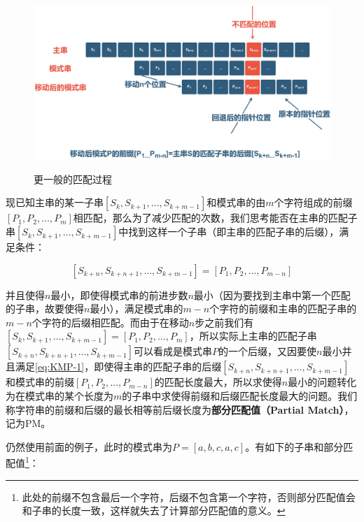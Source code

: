 \begin{figure}[!htb]
    \centering
    \includegraphics[width=0.8\linewidth]{images/KMP-2.pdf}\\
    \caption{更一般的匹配过程}
\end{figure}

现已知主串的某一子串$[S_k, S_{k + 1}, \dots, S_{k + m - 1}]$和模式串的由$m$个字符组成的前缀$[P_1, P_2, \dots, P_m]$相匹配，那么为了减少匹配的次数，我们思考能否在主串的匹配子串$[S_k, S_{k + 1}, \dots, S_{k + m - 1}]$中找到这样一个子串（即主串的匹配子串的后缀），满足条件：

\begin{equation}\label{eq:KMP-1}
    [S_{k + n}, S_{k + n + 1}, \dots, S_{k + m - 1}] = [P_1, P_2, \dots, P_{m - n}]
\end{equation}

并且使得$n$最小，即使得模式串的前进步数$n$最小（因为要找到主串中第一个匹配的子串，故要使得$n$最小），满足模式串的$m - n$个字符的前缀和主串的匹配子串的$m - n$个字符的后缀相匹配。而由于在移动$n$步之前我们有$[S_k, S_{k + 1}, \dots, S_{k + m - 1}] = [P_1, P_2, \dots, P_m]$，所以实际上主串的匹配子串$[S_{k + n}, S_{k + n + 1}, \dots, S_{k + m - 1}]$可以看成是模式串$P$的一个后缀，又因要使$n$最小并且满足\ref{eq:KMP-1}，即使得主串的匹配子串的后缀$[S_{k + n}, S_{k + n + 1}, \dots, S_{k + m - 1}]$和模式串的前缀$[P_1, P_2, \dots, P_{m - n}]$的匹配长度最大，所以求使得$n$最小的问题转化为在模式串的某个长度为$m$的子串中求使得前缀和后缀匹配长度最大的问题。我们称字符串的前缀和后缀的最长相等前后缀长度为\textbf{部分匹配值（Partial Match）}，记为PM。

仍然使用前面的例子，此时的模式串为$P = [a, b, c, a, c]$。有如下的子串和部分匹配值\footnote{此处的前缀不包含最后一个字符，后缀不包含第一个字符，否则部分匹配值会和子串的长度一致，这样就失去了计算部分匹配值的意义。}：

